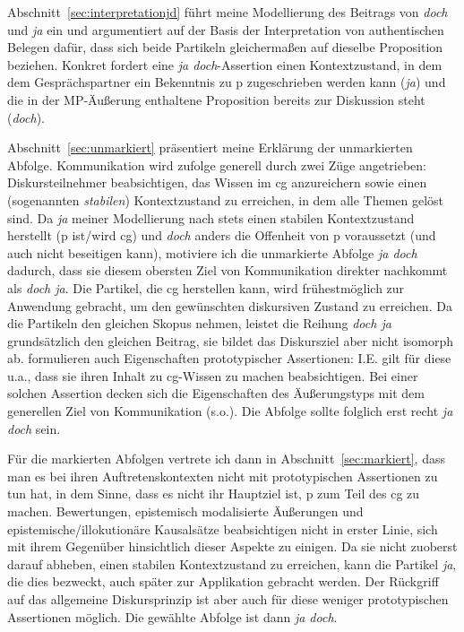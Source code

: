 Abschnitt~\ref{sec:interpretationjd} führt meine Modellierung des Beitrags von \textit{doch} und \textit{ja} ein und argumentiert auf der Basis der Interpretation von authentischen Belegen dafür, dass sich beide Partikeln gleichermaßen auf dieselbe Proposition beziehen. Konkret fordert eine \textit{ja doch}-Assertion einen Kontextzustand, in dem dem Gesprächspartner ein Bekenntnis zu p zugeschrieben werden kann (\textit{ja}) und die in der MP-Äußerung enthaltene Proposition bereits zur Diskussion steht (\textit{doch}). 

Abschnitt~\ref{sec:unmarkiert} präsentiert meine Erklärung der unmarkierten Abfolge. Kommunikation wird \citet{Farkas2010} zufolge generell durch zwei Züge angetrieben: Diskursteilnehmer beabsichtigen, das Wissen im cg anzureichern sowie einen (sogenannten \textit{stabilen}) Kontextzustand zu erreichen, in dem alle Themen gelöst sind. Da \textit{ja} meiner Modellierung nach stets einen stabilen Kontextzustand herstellt (p ist/wird cg) und \textit{doch} anders die Offenheit von p voraussetzt (und auch nicht beseitigen kann), motiviere ich die unmarkierte Abfolge \textit{ja doch} dadurch, dass sie diesem obersten Ziel von Kommunikation direkter nachkommt als \textit{doch ja}. Die Partikel, die cg herstellen kann, wird frühestmöglich zur Anwendung gebracht, um den gewünschten diskursiven Zustand zu erreichen. Da die Partikeln den gleichen Skopus  nehmen, leistet die Reihung \textit{doch ja} grundsätzlich den gleichen Beitrag, sie bildet das Diskursziel aber nicht isomorph  ab. \citet{Farkas2010} formulieren auch Eigenschaften  prototypischer Assertionen: I.E. gilt für diese u.a., dass sie ihren Inhalt zu cg-Wissen zu machen beabsichtigen. Bei einer solchen Assertion decken sich die Eigenschaften des Äußerungstyps mit dem generellen Ziel von Kommunikation (s.o.). Die Abfolge sollte folglich erst recht \textit{ja doch} sein.  

Für die markierten Abfolgen vertrete ich dann in Abschnitt~\ref{sec:markiert}, dass man es bei ihren Auftretenskontexten nicht mit prototypischen Assertionen zu tun hat, in dem Sinne, dass es nicht ihr Hauptziel ist, p zum Teil des cg zu machen. Be\-wertungen, epistemisch modalisierte Äußerungen und epistemische/illokutionä\-re Kausalsätze beabsichtigen nicht in erster Linie, sich mit ihrem Gegenüber hinsichtlich dieser Aspekte zu einigen. Da sie nicht zuoberst darauf abheben, einen stabilen Kontextzustand zu erreichen, kann die Partikel \textit{ja}, die dies bezweckt, auch später zur Applikation gebracht werden. Der Rückgriff auf das allgemeine Diskursprinzip ist aber auch für diese weniger prototypischen Assertionen mög\-lich. Die gewählte Abfolge ist dann \textit{ja doch}. 

